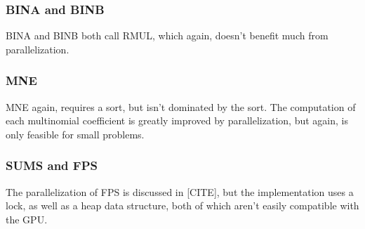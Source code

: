 \subsubsection{BINA and BINB}
BINA and BINB both call RMUL, which again, doesn't benefit much from parallelization.

\subsubsection{MNE}
MNE again, requires a sort, but isn't dominated by the sort. The computation of each multinomial coefficient is greatly improved by parallelization, but again, is only feasible for small problems.



\subsubsection{SUMS and FPS}
The parallelization of FPS is discussed in [CITE], but the implementation uses a lock, as well as a heap data structure, both of which aren't easily compatible with the GPU.